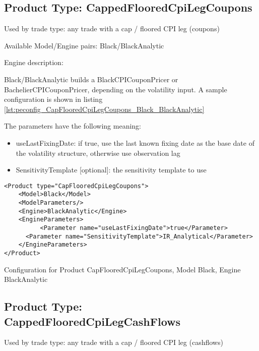 \subsection{Product Type: CappedFlooredCpiLegCoupons}

Used by trade type: any trade with a cap / floored CPI leg (coupons)

Available Model/Engine pairs: Black/BlackAnalytic

Engine description:

Black/BlackAnalytic builds a BlackCPICouponPricer or BachelierCPICouponPricer, depending on the volatility input. A sample configuration is
shown in listing \ref{lst:peconfig_CapFlooredCpiLegCoupons_Black_BlackAnalytic}

The parameters have the following meaning:

\begin{itemize}
\item useLastFixingDate: if true, use the last known fixing date as the base date of the volatility structure, otherwise
  use observation lag        
\item SensitivityTemplate [optional]: the sensitivity template to use 
\end{itemize}

\begin{longlisting}
\begin{verbatim}
<Product type="CapFlooredCpiLegCoupons">
    <Model>Black</Model>
    <ModelParameters/>
    <Engine>BlackAnalytic</Engine>
    <EngineParameters>
          <Parameter name="useLastFixingDate">true</Parameter>
      <Parameter name="SensitivityTemplate">IR_Analytical</Parameter>
    </EngineParameters>
</Product>
\end{verbatim}
\caption{Configuration for Product CapFlooredCpiLegCoupons, Model Black, Engine BlackAnalytic}
\label{lst:peconfig_CapFlooredCpiLegCoupons_Black_BlackAnalytic}
\end{longlisting}

\subsection{Product Type: CappedFlooredCpiLegCashFlows}

Used by trade type: any trade with a cap / floored CPI leg (cashflows)

